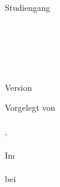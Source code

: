 %
%

\begin{titlepage}
\cfgUniversityName\\
\cfgUniversityDepartment\\
Studiengang \cfgUniversityDegreeCourse\\
\\
\cfgDocClassification\\
\cfgCourseName\\

	\begin{center}
		\Huge
		\cfgDocTitle\\
		\vspace{10mm}
		\Large
		\cfgDocSubTitle\\
		\vspace{15mm}
		\normalsize
		Version \cfgDocVersion
	\end{center}

	\vfill
	Vorgelegt von\\
	\vspace{3mm} \ \\
	\cfgAuthorName, \cfgAuthorMatriculationNum\\
	\cfgAuthorContact\\
	Im \cfgSemesterName\\
	\vspace{3mm} \ \\
	bei \cfgUniversitySupervisorName\\
	\cfgUniversitySupervisorContact\\

\end{titlepage}

